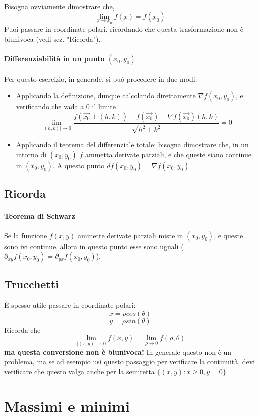 \documentclass[a4paper,12pt]{book}
\newcommand{\ubar}{\underbar}
\begin{document}
Bisogna ovviamente dimostrare che, $$\lim_{\ubar{x}\rightarrow\ubar{x}_0}\ubar{f}(\ubar{x}) = \ubar{f}(\ubar{x}_0)$$
Puoi passare in coordinate polari, ricordando che questa trasformazione non è biunivoca (vedi sez. "Ricorda").

\paragraph{Differenziabilità in un punto $(x_0, y_0)$}
Per questo esercizio, in generale, si può procedere in due modi:
\begin{itemize}
 \item Applicando la definizione, dunque calcolando direttamente $\nabla f(x_0, y_0)$, e verificando che vada a 0 il limite
 $$\lim_{|(h, k)| \to 0} \dfrac{f(\vec{x_0}+(h, k)) - f(\vec{x_0}) - \nabla f(\vec{x_0})(h, k)}{\sqrt{h^2+k^2}} = 0 $$
 \item Applicando il teorema del differenziale totale: bisogna dimostrare che, in un intorno di $(x_0, y_0)$ $f$ ammetta derivate parziali, e che queste siano continue in $(x_0, y_0)$. A questo punto $df(x_0, y_0) = \nabla f(x_0, y_0)$
\end{itemize}

\subsection{Ricorda}
\paragraph{Teorema di Schwarz}
Se la funzione $f(x,y)$ ammette derivate parziali miste in $(x_0, y_0)$, e queste sono ivi continue, allora in questo punto esse sono uguali ($\partial_{xy}f(x_0, y_0) = \partial_{yx}f(x_0, y_0)$).
\subsection{Trucchetti}
È spesso utile passare in coordinate polari: $$ x = \rho cos(\theta)$$ $$ y = \rho sin(\theta) $$
Ricorda che
$$ \lim_{|(x, y)| \to 0} f(x, y) = \lim_{\rho \to 0} f(\rho, \theta) $$
\textbf{ma questa conversione non è biunivoca!}
In generale questo non è un problema, ma se ad esempio usi questo passaggio per verificare la continuità, devi verificare che questo valga anche per la semiretta $\{(x, y) : x\geq 0, y=0\}$


\section{Massimi e minimi}
\end{document}
